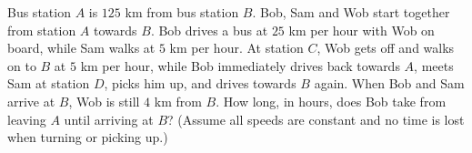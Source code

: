 Bus station $A$ is $125$ km from bus station $B$. Bob, Sam and Wob start together from station $A$ towards $B$. Bob drives a bus at $25$ km per hour with Wob on board, while Sam walks at $5$ km per hour. At station $C$, Wob gets off and walks on to $B$ at $5$ km per hour, while Bob immediately drives back towards $A$, meets Sam at station $D$, picks him up, and drives towards $B$ again. When Bob and Sam arrive at $B$, Wob is still $4$ km from $B$. How long, in hours, does Bob take from leaving $A$ until arriving at $B$? (Assume all speeds are constant and no time is lost when turning or picking up.)
